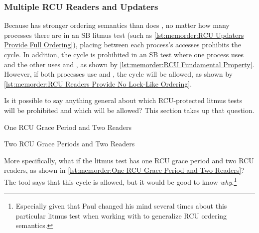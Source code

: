 \subsubsection{Multiple RCU Readers and Updaters}
\label{sec:memorder:Multiple RCU Readers and Updaters}

Because  has stronger ordering semantics than does
, no matter how many processes there are in an SB
litmus test (such as \cref{lst:memorder:RCU Updaters Provide Full Ordering}),
placing  between each process's
accesses prohibits the cycle.
In addition, the cycle is prohibited in an SB test where one process
uses  and the other uses  and
, as shown by
\cref{lst:memorder:RCU Fundamental Property}.
However, if both processes use  and
, the cycle will be allowed, as shown by
\cref{lst:memorder:RCU Readers Provide No Lock-Like Ordering}.

Is it possible to say anything general about which RCU-protected
litmus tests will be prohibited and which will be allowed?
This section takes up that question.

\begin{listing}[tbp]

\caption{One RCU Grace Period and Two Readers}
\label{lst:memorder:One RCU Grace Period and Two Readers}
\end{listing}

\begin{listing}[tbp]

\caption{Two RCU Grace Periods and Two Readers}
\label{lst:memorder:Two RCU Grace Periods and Two Readers}
\end{listing}

More specifically, what if the litmus test has one RCU grace
period and two RCU readers, as shown in
\cref{lst:memorder:One RCU Grace Period and Two Readers}?
The  tool says that this cycle is allowed, but it would be
good to know \emph{why}.\footnote{
	Especially given that Paul changed his mind several times about
	this particular litmus test when working with  to
	generalize RCU ordering semantics.}

